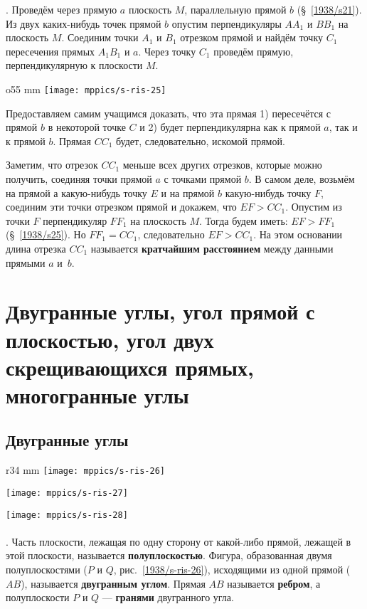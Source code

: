 \medskip

\mbox{.}
Проведём через прямую $a$ плоскость $M$, параллельную прямой $b$ (§~\ref{1938/s21}).
Из двух каких-нибудь точек прямой $b$ опустим перпендикуляры $AA_1$ и $BB_1$ на плоскость $M$.
Соединим точки $A_1$ и $B_1$ отрезком прямой и найдём точку $C_1$ пересечения прямых $A_1B_1$ и $a$.
Через точку $C_1$ проведём прямую, перпендикулярную к плоскости $M$.

\begin{wrapfigure}{o}{55 mm}
\vskip-0mm
\centering
\texttt{[image: mppics/s-ris-25]}
\caption{}\label{1938/s-ris-25}
\end{wrapfigure}

Предоставляем самим учащимся доказать, что эта прямая 1) пересечётся с прямой $b$ в некоторой точке $C$ и 2) будет перпендикулярна как к прямой $a$, так и к прямой $b$.
Прямая $CC_1$ будет, следовательно, искомой прямой.


Заметим, что отрезок $CC_1$ меньше всех других отрезков, которые можно получить, соединяя точки прямой $a$ с точками прямой $b$.
В самом деле, возьмём на прямой а какую-нибудь точку $E$ и на прямой $b$ какую-нибудь точку $F$, соединим эти точки отрезком прямой и докажем, что $EF>CC_1$.
Опустим из точки $F$ перпендикуляр $FF_1$ на плоскость $M$.
Тогда будем иметь: $EF>FF_1$ (§~\ref{1938/s25}).
Но $FF_1=CC_1$, следовательно $EF>CC_1$.
На этом основании длина отрезка $CC_1$ называется \textbf{кратчайшим расстоянием} между данными прямыми $a$ и~$b$.

\section[Углы]{Двугранные углы,
угол прямой с плоскостью,
угол двух скрещивающихся прямых,
многогранные углы}

\subsection*{Двугранные углы}

\begin{wrapfigure}{r}{34 mm}
\vskip-0mm
\centering
\texttt{[image: mppics/s-ris-26]}
\caption{}\label{1938/s-ris-26}
\bigskip
\texttt{[image: mppics/s-ris-27]}
\caption{}\label{1938/s-ris-27}
\bigskip
\texttt{[image: mppics/s-ris-28]}
\caption{}\label{1938/s-ris-28}
\end{wrapfigure}


\paragraph{}\label{1938/s38}
\mbox{.}
Часть плоскости, лежащая по одну сторону от какой-либо прямой, лежащей в этой плоскости, называется \textbf{полуплоскостью}.
Фигура, образованная двумя полуплоскостями ($P$ и $Q$, рис.~\ref{1938/s-ris-26}), исходящими из одной прямой ($AB$), называется \textbf{двугранным углом}.
Прямая $AB$ называется \textbf{ребром}, а полуплоскости $P$ и $Q$ — \textbf{гранями} двугранного угла.

